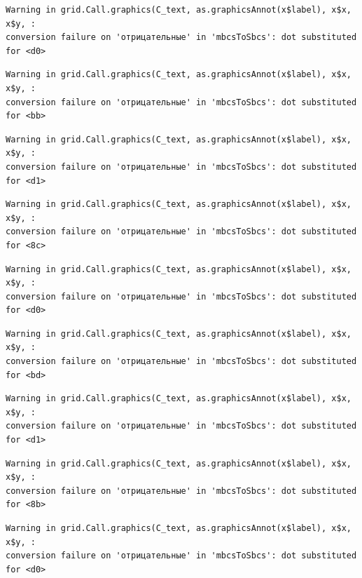 \documentclass[
  letterpaper,
  DIV=11,
  numbers=noendperiod]{scrreprt}
\theoremstyle{definition}
\theoremstyle{remark}
\begin{document}
\begin{verbatim}
Warning in grid.Call.graphics(C_text, as.graphicsAnnot(x$label), x$x, x$y, :
conversion failure on 'отрицательные' in 'mbcsToSbcs': dot substituted for <d0>
\end{verbatim}

\begin{verbatim}
Warning in grid.Call.graphics(C_text, as.graphicsAnnot(x$label), x$x, x$y, :
conversion failure on 'отрицательные' in 'mbcsToSbcs': dot substituted for <bb>
\end{verbatim}

\begin{verbatim}
Warning in grid.Call.graphics(C_text, as.graphicsAnnot(x$label), x$x, x$y, :
conversion failure on 'отрицательные' in 'mbcsToSbcs': dot substituted for <d1>
\end{verbatim}

\begin{verbatim}
Warning in grid.Call.graphics(C_text, as.graphicsAnnot(x$label), x$x, x$y, :
conversion failure on 'отрицательные' in 'mbcsToSbcs': dot substituted for <8c>
\end{verbatim}

\begin{verbatim}
Warning in grid.Call.graphics(C_text, as.graphicsAnnot(x$label), x$x, x$y, :
conversion failure on 'отрицательные' in 'mbcsToSbcs': dot substituted for <d0>
\end{verbatim}

\begin{verbatim}
Warning in grid.Call.graphics(C_text, as.graphicsAnnot(x$label), x$x, x$y, :
conversion failure on 'отрицательные' in 'mbcsToSbcs': dot substituted for <bd>
\end{verbatim}

\begin{verbatim}
Warning in grid.Call.graphics(C_text, as.graphicsAnnot(x$label), x$x, x$y, :
conversion failure on 'отрицательные' in 'mbcsToSbcs': dot substituted for <d1>
\end{verbatim}

\begin{verbatim}
Warning in grid.Call.graphics(C_text, as.graphicsAnnot(x$label), x$x, x$y, :
conversion failure on 'отрицательные' in 'mbcsToSbcs': dot substituted for <8b>
\end{verbatim}

\begin{verbatim}
Warning in grid.Call.graphics(C_text, as.graphicsAnnot(x$label), x$x, x$y, :
conversion failure on 'отрицательные' in 'mbcsToSbcs': dot substituted for <d0>
\end{verbatim}
\end{document}
